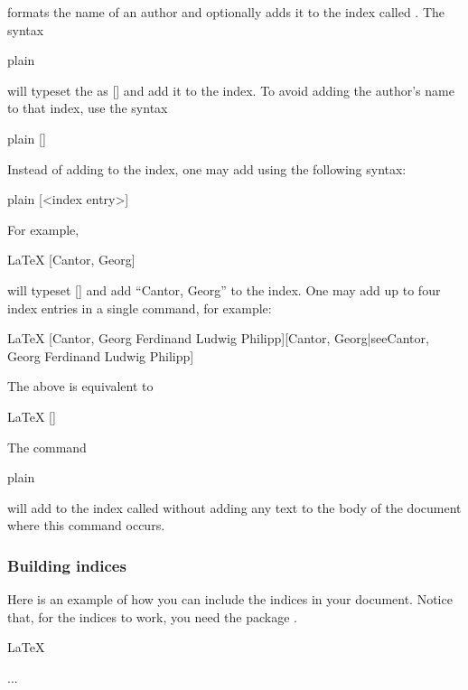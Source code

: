 \code{\anauthor} formats the name of an author and optionally adds it to the index called . The syntax
\begin{snippet}{plain}
\end{snippet}
will typeset the  as [] and add it to the  index. To avoid adding the author's name to that index, use the syntax
\begin{snippet}{plain}
[]
\end{snippet}
Instead of adding  to the  index, one may add  using the following syntax:
\begin{snippet}{plain}
[<index entry>]
\end{snippet}
For example,
\begin{snippet}{LaTeX}
[Cantor, Georg]
\end{snippet}
will typeset [] and add ``Cantor, Georg'' to the  index. One may add up to four index entries in a single \code{\anauthor} command, for example:
\begin{snippet}{LaTeX}
[Cantor, Georg Ferdinand Ludwig Philipp][Cantor, Georg|see{Cantor, Georg Ferdinand Ludwig Philipp}]
\end{snippet}
The above is equivalent to
\begin{snippet}{LaTeX}
[]
\end{snippet}
The command
\begin{snippet}{plain}
\end{snippet}
will add  to the index called  without adding any text to the body of the document where this command occurs.

\subsubsection{Building indices}

Here is an example of how you can include the indices in your document. Notice that, for the indices to work, you need the package .
\begin{snippet}{LaTeX}
\usepackage[useimakeidx=true]{lathalesians-commons}

\makeindex[name=general, title=Subject index]
\makeindex[name=authors, title=Index of authors]



...




\printindex[general]
\printindex[authors]


\end{snippet}

